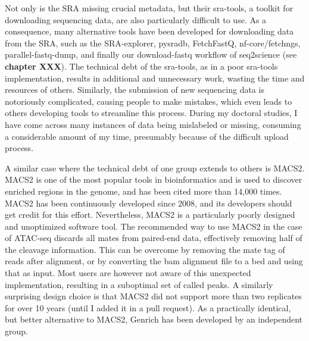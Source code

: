 Not only is the SRA missing crucial metadata, but their sra-tools, a toolkit for downloading sequencing data, are also particularly difficult to use. As a consequence, many alternative tools have been developed for downloading data from the SRA, such as the SRA-explorer\cite{sraexplorer}, pysradb\cite{pysradb}, FetchFastQ\cite{galvez2022metadata}, nf-core/fetchngs\cite{fetchngs}, parallel-fastq-dump\cite{parallelfastq}, and finally our download-fastq workflow of seq2science\cite{seq2science} (see \textbf{chapter XXX}). The technical debt of the sra-tools, as in a poor sra-tools implementation, results in additional and unnecessary work, wasting the time and resources of others. Similarly, the submission of new sequencing data is notoriously complicated, causing people to make mistakes, which even leads to others developing tools to streamline this process\cite{Quiones2020}. During my doctoral studies, I have come across many instances of data being mislabeled or missing, consuming a considerable amount of my time, presumably because of the difficult upload process.

A similar case where the technical debt of one group extends to others is MACS2. MACS2 is one of the most popular tools in bioinformatics and is used to discover enriched regions in the genome, and has been cited more than 14,000 times\cite{Zhang2008}. MACS2 has been continuously developed since 2008, and its developers should get credit for this effort. Nevertheless, MACS2 is a particularly poorly designed and unoptimized software tool. The recommended way to use MACS2 in the case of ATAC-seq discards all mates from paired-end data, effectively removing half of the cleavage information\cite{Gaspar2018}. This can be overcome by removing the mate tag of reads after alignment, or by converting the bam alignment file to a bed and using that as input. Most users are however not aware of this unexpected implementation, resulting in a suboptimal set of called peaks. A similarly surprising design choice is that MACS2 did not support more than two replicates for over 10 years (until I added it in a pull request). As a practically identical, but better alternative to MACS2, Genrich has been developed by an independent group\cite{genrich}. 

